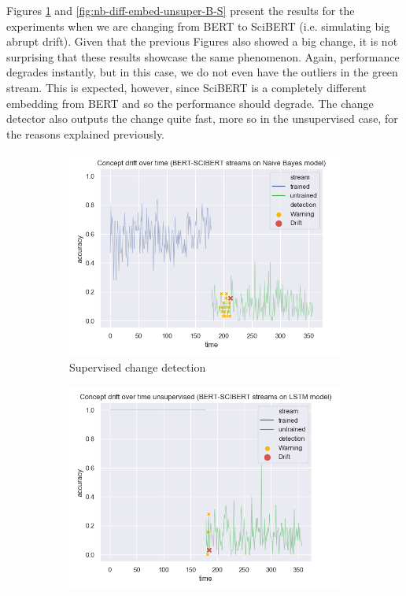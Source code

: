 \documentclass[12pt]{extreport}
\begin{document}
Figures \ref{fig:nb-diff-embed-super-B-S} and \ref{fig:nb-diff-embed-unsuper-B-S} present the results for the experiments when we are changing from BERT to SciBERT (i.e. simulating big abrupt drift). Given that the previous Figures also showed a big change, it is not surprising that these results showcase the same phenomenon. Again, performance degrades instantly, but in this case, we do not even have the outliers in the green stream. This is expected, however, since SciBERT is a completely different embedding from BERT and so the performance should degrade. The change detector also outputs the change quite fast, more so in the unsupervised case, for the reasons explained previously.

\begin{figure}[H]
\centering
\begin{subfigure}{.5\textwidth}
  \centering
  \includegraphics[width=\linewidth]{assets/detecting-change/diff_embed_nb_wos_1_BERT_SCIBERT.png}
  \caption{Supervised change detection}
  \label{fig:nb-diff-embed-super-B-S}
\end{subfigure}%
\begin{subfigure}{.5\textwidth}
  \centering
  \includegraphics[width=\linewidth]{assets/detecting-change/diff_embed_nb_wos_1_BERT_SCIBERT_unsupervised.png}

\end{subfigure}
\end{figure}
\end{document}
